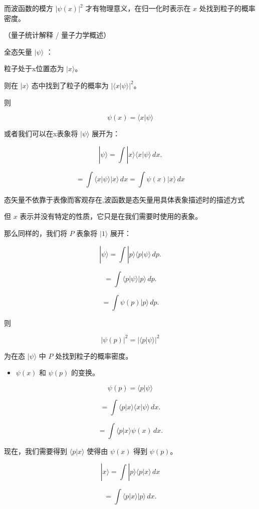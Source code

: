 \documentclass[lang=cn,15pt]{elegantbook}
\begin{document}
而波函数的模方 $|\psi(x)|^2$ 才有物理意义，在归一化时表示在 $x$ 处找到粒子的概率密度。

（量子统计解释 / 量子力学概述）

全态矢量 $| \psi \rangle$ ：

粒子处于x位置态为 $| x \rangle$。

则在 $| x \rangle$ 态中找到了粒子的概率为 $|\langle x | \psi \rangle|^2$。

则 

\[
\psi(x) = \langle x | \psi \rangle
\]

或者我们可以在x表象将 $| \psi \rangle$ 展开为：

\[
| \psi \rangle = \int | x \rangle \langle x | \psi \rangle \, dx.
\]

\[
= \int \langle x | \psi \rangle | x \rangle \, dx=\int  \psi(x)  | x \rangle \, dx
\]

态矢量不依靠于表像而客观存在,波函数是态矢量用具体表象描述时的描述方式

但 $x$ 表示并没有特定的性质，它只是在我们需要时使用的表象。

那么同样的，我们将 $P$ 表象将 $| 1 \rangle$ 展开：

\[
| \psi \rangle = \int | p \rangle \langle p | \psi \rangle \, dp.
\]

\[
= \int \langle p | \psi \rangle | p \rangle \, dp.
\]

\[
= \int \psi(p) | p \rangle \, dp.
\]

则 

\[
|\psi(p)|^2 = |\langle p | \psi \rangle|^2
\]

为在态 $| \psi \rangle$ 中 $P$ 处找到粒子的概率密度。

\begin{itemize}
	\item $\psi(x)$ 和 $\psi(p)$ 的变换。
\end{itemize}

\[
\psi(p) = \langle p | \psi \rangle
\]

\[
= \int \langle p | x \rangle \langle x | \psi \rangle \, dx.
\]

\[
= \int \langle p | x \rangle \psi(x) \, dx.
\]

现在，我们需要得到 $\langle p | x \rangle$ 使得由 $\psi(x)$ 得到 $\psi(p)$。

\[
| x \rangle = \int | p \rangle \langle p | x \rangle \, dx
\]

\[
= \int \langle p | x \rangle | p \rangle \, dx.
\]

\end{document}
